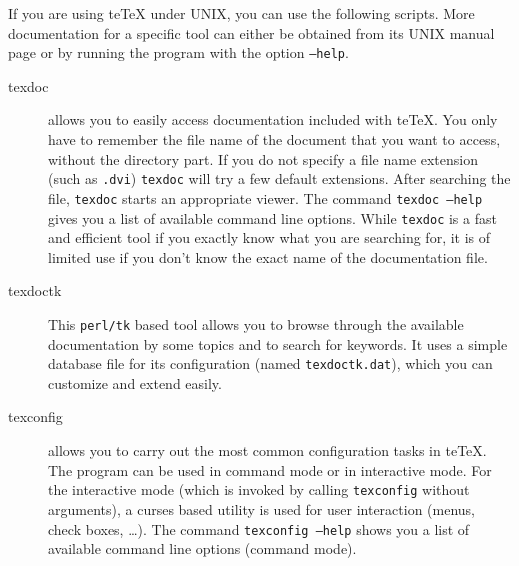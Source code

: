 \documentclass[11pt,a4paper]{article}
\newcommand{\teTeX}{\textrm{te}\TeX\xspace}
\begin{document}
If you are using \teTeX{} under UNIX, you can use the following
scripts. More documentation for a specific tool can either be obtained
from its UNIX manual page or by running the program with the option
\texttt{--help}. 
\begin{description}
\item[texdoc] allows you to easily access documentation included with
  \teTeX. You only have to remember the file name of the document that
  you want to access, without the directory part. If you do not
  specify a file name extension (such as \texttt{.dvi})
  \texttt{texdoc} will try a few default extensions. After searching
  the file, \texttt{texdoc} starts an appropriate viewer.  The command
  \texttt{texdoc~--help} gives you a list of available command line
  options. While \texttt{texdoc} is a fast and efficient tool if you
  exactly know what you are searching for, it is of limited use if you
  don't know the exact name of the documentation file.
\item [texdoctk] This \texttt{perl/tk} based tool allows you to browse
  through the available documentation by some topics and to search for
  keywords. It uses a simple database file for its configuration
  (named \texttt{texdoctk.dat}), which you can customize and extend
  easily.
\item[texconfig] allows you to carry out the most common configuration
  tasks in \teTeX. The program can be used in command mode or in
  interactive mode. For the interactive mode (which is invoked by
  calling \texttt{texconfig} without arguments), a curses based
  utility is used for user interaction (menus, check boxes, \ldots).
  The command \texttt{texconfig --help} shows you a list of available
  command line options (command mode).
  

\end{description}
\end{document}
